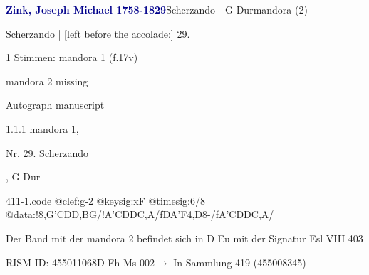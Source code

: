 \documentclass[twocolumn, 12pt]{book}
\begin{document}
\par \vspace{16pt} \textcolor{darkblue}{\textbf{Zink, Joseph Michael  1758-1829}}\hfillplus{\textbf{[411]}}\newline Scherzando - G-Dur\newline mandora (2)
\par \begin{itshape}[f.17v, at left:] Scherzando | [left before the accolade:] 29.\end{itshape} 
\par \textcolor{darkblue}{}  1 Stimmen: mandora 1  (f.17v)\newline \begin{small} mandora 2 missing\end{small} \newline Autograph manuscript
\par 1.1.1  mandora 1, \begin{itshape}Nr. 29. Scherzando\end{itshape}, G-Dur  
\begin{filecontents*}{411-1.code}
@clef:g-2
@keysig:xF
@timesig:6/8
@data:!8,G'CD{D,B}G/!A'CDDC,A/fDA'F4,D8-/fA'CDDC,A/
\end{filecontents*}
\newline %
\par Der Band mit der mandora 2 befindet sich in D Eu mit der Signatur Esl VIII 403
\par RISM-ID: 455011068\newline D-Fh  Ms 002\newline $\rightarrow$ In Sammlung 419 (455008345)
      
\end{document}

